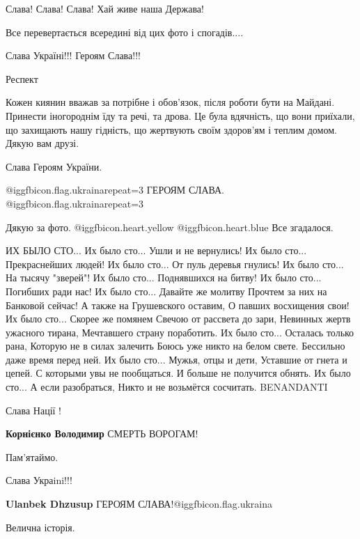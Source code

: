 \begin{itemize}
Слава! Слава! Слава! Хай живе наша Держава!

Все перевертається всередині від цих фото і спогадів....

Слава Україні!!! Героям Слава!!!

Респект


Кожен киянин вважав за потрібне і обов'язок, після роботи бути на Майдані.
Принести іногороднім їду та речі, та дрова. Це була вдячність, що вони
приїхали, що захищають нашу гідність, що жертвують своїм здоров'ям і теплим
домом. Дякую вам друзі.

Слава Героям України.

@igg{fbicon.flag.ukraina}{repeat=3} ГЕРОЯМ СЛАВА. @igg{fbicon.flag.ukraina}{repeat=3}

Дякую за фото.  @igg{fbicon.heart.yellow}  @igg{fbicon.heart.blue} 
Все згадалося.


\obeycr
ИХ БЫЛО СТО...
Их было сто... Ушли и не вернулись!
Их было сто... Прекраснейших людей!
Их было сто... От пуль деревья гнулись!
Их было сто... На тысячу "зверей"!
Их было сто... Поднявшихся на битву!
Их было сто... Погибших ради нас!
Их было сто... Давайте же молитву
Прочтем за них на Банковой сейчас!
А также на Грушевского оставим,
О павших восхищения свои!
Их было сто... Скорее же помянем
Свечою от рассвета до зари,
Невинных жертв ужасного тирана,
Мечтавшего страну поработить.
Их было сто... Осталась только рана,
Которую не в силах залечить
Боюсь уже никто на белом свете.
Бессильно даже время перед ней.
Их было сто... Мужья, отцы и дети,
Уставшие от гнета и цепей.
С которыми увы не пообщаться.
И больше не получится обнять.
Их было сто... А если разобраться,
Никто и не возьмётся сосчитать.
BENANDANTI
\restorecr

Слава Нації !

\textbf{Корнієнко Володимир} СМЕРТЬ ВОРОГАМ!

Пам'ятаймо.

Слава Украini!!!

\textbf{Ulanbek Dhzusup} ГЕРОЯМ СЛАВА!@igg{fbicon.flag.ukraina}

Велична історія.


\end{itemize}
